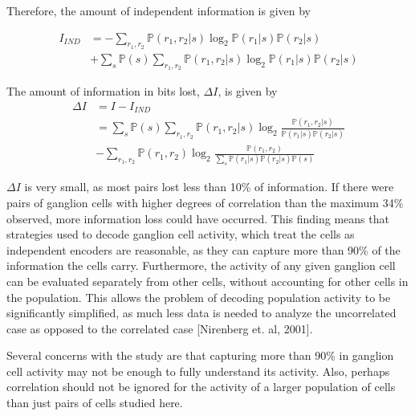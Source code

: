 \documentclass[twoside]{article}
\begin{document}
\begin{multicols}{2}
Therefore, the amount of independent information is given by

\begin{align}
	I_{IND} 
		&= -\sum_{r_1,r_2}\mathbb{P}(r_1,r_2|s)\log_2\mathbb{P}(r_1|s)\mathbb{P}(r_2|s) \\
		&+ \sum_s\mathbb{P}(s) \sum_{r_1,r_2}\mathbb{P}(r_1,r_2|s)\log_2\mathbb{P}(r_1|s)\mathbb{P}(r_2|s) 
\end{align}

The amount of information in bits lost, $\Delta I$, is given by 
\begin{align}
	\Delta I 
		&= I - I_{IND} \\
		&= \sum_s\mathbb{P}(s) \sum_{r_1,r_2}\mathbb{P}(r_1,r_2|s) \log_2 \frac{\mathbb{P}(r_1,r_2|s)}{\mathbb{P}(r_1|s)\mathbb{P}(r_2|s)} \\
		&- \sum_{r_1,r_2}\mathbb{P}(r_1,r_2) \log_2 \frac{\mathbb{P}(r_1,r_2)}{\sum_s \mathbb{P}(r_1|s)\mathbb{P}(r_2|s) \mathbb{P}(s)} 
\end{align}

$\Delta I$ is very small, as most pairs lost less than 10\% of information. If there were pairs of ganglion cells with higher degrees of correlation than the maximum 34\% observed, more information loss could have occurred. This finding means that strategies used to decode ganglion cell activity, which treat the cells as independent encoders are reasonable, as they can capture more than 90\% of the information the cells carry. Furthermore, the activity of any given ganglion cell can be evaluated separately from other cells, without accounting for other cells in the population. This allows the problem of decoding population activity to be significantly simplified, as much less data is needed to analyze the uncorrelated case as opposed to the correlated case [Nirenberg et. al, 2001]. 

Several concerns with the study are that capturing more than 90\% in ganglion cell activity may not be enough to fully understand its activity. Also, perhaps correlation should not be ignored for the activity of a larger population of cells than just pairs of cells studied here. 





\end{multicols}
\end{document}

